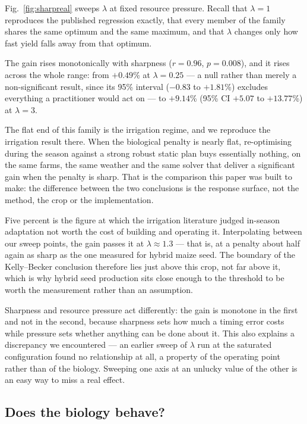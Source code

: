 \documentclass[10pt,twocolumn]{article}
\begin{document}
Fig.~\ref{fig:sharpreal} sweeps $\lambda$ at fixed resource
pressure. Recall that $\lambda = 1$ reproduces the published
regression exactly, that every member of the family shares the same
optimum and the same maximum, and that $\lambda$ changes only how
fast yield falls away from that optimum.


The gain rises monotonically with sharpness ($r = 0.96$,
$p = 0.008$), and it rises across the whole range: from
$+0.49$\% at $\lambda = 0.25$ ---
a null rather than merely a non-significant result, since its
95\% interval ($-0.83$ to $+1.81$\%) excludes everything a practitioner
would act on --- to
$+9.14$\% (95\% CI $+5.07$ to $+13.77$\%) at $\lambda = 3$.

The flat end of this family is the irrigation regime, and we
reproduce the irrigation result there. When the biological
penalty is nearly flat, re-optimising during the season against
a strong robust static plan buys essentially nothing, on the
same farms, the same weather and the same solver that deliver a
significant gain when the penalty is sharp. That is the
comparison this paper was built to make: the difference between
the two conclusions is the response surface, not the method, the
crop or the implementation.

Five percent is the figure at which the irrigation literature
judged in-season adaptation not worth the cost of building
and operating it. Interpolating between our sweep points, the
gain passes it at $\lambda \approx 1.3$ --- that is,
at a penalty about half again as sharp as the one measured
for hybrid maize seed. The boundary of the Kelly--Becker
conclusion therefore lies just above this crop, not far above
it, which is why hybrid seed production sits close enough to
the threshold to be worth the measurement rather than an
assumption.

Sharpness and resource pressure act differently: the gain is
monotone in the first and not in the second, because sharpness sets
how much a timing error costs while pressure sets whether anything
can be done about it. This also explains a discrepancy we
encountered --- an earlier sweep of $\lambda$ run at the saturated
configuration found no relationship at all, a property of the
operating point rather than of the biology. Sweeping one axis at an
unlucky value of the other is an easy way to miss a real effect.

\subsection{Does the biology behave?}
\end{document}
